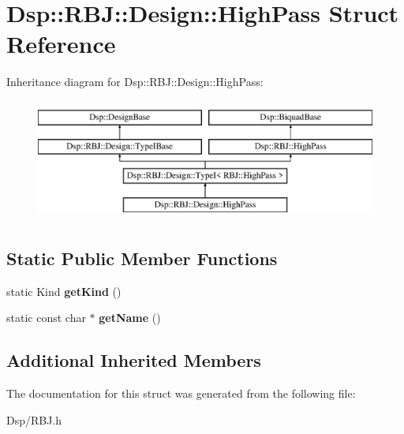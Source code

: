 \hypertarget{structDsp_1_1RBJ_1_1Design_1_1HighPass}{\section{Dsp\-:\-:R\-B\-J\-:\-:Design\-:\-:High\-Pass Struct Reference}
\label{structDsp_1_1RBJ_1_1Design_1_1HighPass}
}
Inheritance diagram for Dsp\-:\-:R\-B\-J\-:\-:Design\-:\-:High\-Pass\-:\begin{figure}[H]
\begin{center}
\leavevmode
\includegraphics[height=4.000000cm]{structDsp_1_1RBJ_1_1Design_1_1HighPass}
\end{center}
\end{figure}
\subsection*{Static Public Member Functions}
\begin{DoxyCompactItemize}
\item 
\hypertarget{structDsp_1_1RBJ_1_1Design_1_1HighPass_a6f78ad13ca0f07943442ec7fc7cb4fa1}{static Kind {\bfseries get\-Kind} ()}\label{structDsp_1_1RBJ_1_1Design_1_1HighPass_a6f78ad13ca0f07943442ec7fc7cb4fa1}

\item 
\hypertarget{structDsp_1_1RBJ_1_1Design_1_1HighPass_a721172c313117feb069d6e498b61e798}{static const char $\ast$ {\bfseries get\-Name} ()}\label{structDsp_1_1RBJ_1_1Design_1_1HighPass_a721172c313117feb069d6e498b61e798}

\end{DoxyCompactItemize}
\subsection*{Additional Inherited Members}


The documentation for this struct was generated from the following file\-:\begin{DoxyCompactItemize}
\item 
Dsp/R\-B\-J.\-h\end{DoxyCompactItemize}
